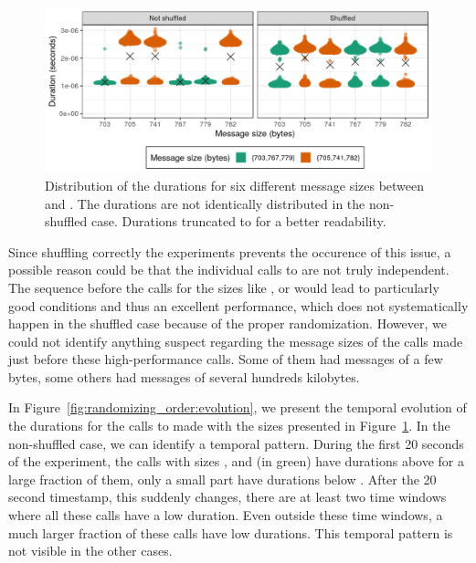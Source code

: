         \begin{figure}[htpb]
            \centering
            \includegraphics[width=\linewidth]{img/experiment/randomizing_order/distribution.png}
            \caption{Distribution of the \recv durations for six different message sizes between  and
            .  The durations are not identically distributed in the non-shuffled case.  Durations
            truncated to  for a better readability.}%
            \label{fig:randomizing_order:distribution}
        \end{figure}

        Since shuffling correctly the experiments prevents the occurence of this issue, a possible reason could be that
        the individual calls to \recv are not truly independent. The sequence before the calls for the sizes like
        ,  or  would lead to particularly good conditions and thus an
        excellent performance, which does not systematically happen in the shuffled case because of the proper
        randomization. However, we could not identify anything suspect regarding the message sizes of the calls made
        just before these high-performance calls. Some of them had messages of a few bytes, some others had messages of
        several hundreds kilobytes.

        In Figure~\ref{fig:randomizing_order:evolution}, we present the temporal evolution of the durations for the
        calls to \recv made with the sizes presented in Figure~\ref{fig:randomizing_order:distribution}. In the
        non-shuffled case, we can identify a temporal pattern. During the first 20 seconds of the experiment, the
        calls with sizes ,  and  (in green) have durations above
         for a large fraction of them, only a small part have durations below
        . After the 20 second timestamp, this suddenly changes, there are at least two time
        windows where all these calls have a low duration. Even outside these time windows, a much larger fraction of
        these calls have low durations. This temporal pattern is not visible in the other cases.


